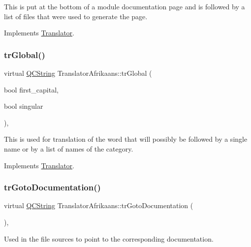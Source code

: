 This is put at the bottom of a module documentation page and is followed by a list of files that were used to generate the page. 

Implements \mbox{\hyperlink{class_translator}{Translator}}.

\mbox{\label{class_translator_afrikaans_a37146e476625c40f7711e06ae6dd22bc}} 
\subsubsection{\texorpdfstring{trGlobal()}{trGlobal()}}
{\footnotesize\ttfamily virtual \mbox{\hyperlink{class_q_c_string}{Q\+C\+String}} Translator\+Afrikaans\+::tr\+Global (\begin{DoxyParamCaption}\item[{bool}]{first\+\_\+capital,  }\item[{bool}]{singular }\end{DoxyParamCaption})\hspace{0.3cm}{\ttfamily [inline]}, {\ttfamily [virtual]}}

This is used for translation of the word that will possibly be followed by a single name or by a list of names of the category. 

Implements \mbox{\hyperlink{class_translator}{Translator}}.

\mbox{\label{class_translator_afrikaans_ab365a1a325d2c16a78678088666238a4}} 
\subsubsection{\texorpdfstring{trGotoDocumentation()}{trGotoDocumentation()}}
{\footnotesize\ttfamily virtual \mbox{\hyperlink{class_q_c_string}{Q\+C\+String}} Translator\+Afrikaans\+::tr\+Goto\+Documentation (\begin{DoxyParamCaption}{ }\end{DoxyParamCaption})\hspace{0.3cm}{\ttfamily [inline]}, {\ttfamily [virtual]}}

Used in the file sources to point to the corresponding documentation. 

